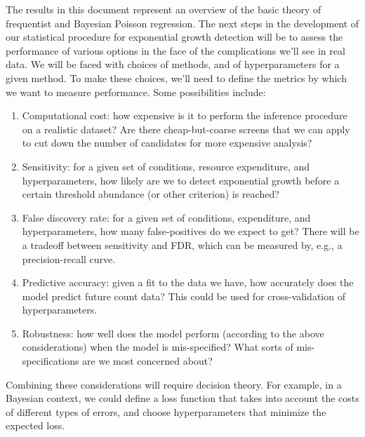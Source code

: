 \documentclass[12pt, letterpaper]{article}
\begin{document}
The results in this document represent an overview of the basic theory of frequentist and Bayesian Poisson regression.
The next steps in the development of our statistical procedure for exponential growth detection will be to assess the performance of various options in the face of the complications we'll see in real data.
We will be faced with choices of methods, and of hyperparameters for a given method.
To make these choices, we'll need to define the metrics by which we want to measure performance.
Some possibilities include:
\begin{enumerate}
    \item Computational cost: how expensive is it to perform the inference procedure on a realistic dataset? Are there cheap-but-coarse screens that we can apply to cut down the number of candidates for more expensive analysis?
    \item Sensitivity: for a given set of conditions, resource expenditure, and hyperparameters, how likely are we to detect exponential growth before a certain threshold abundance (or other criterion) is reached?
    \item False discovery rate: for a given set of conditions, expenditure, and hyperparameters, how many false-positives do we expect to get? There will be a tradeoff between sensitivity and FDR, which can be measured by, e.g., a precision-recall curve.
    \item Predictive accuracy: given a fit to the data we have, how accurately does the model predict future count data? This could be used for cross-validation of hyperparameters.
    \item Robustness: how well does the model perform (according to the above considerations) when the model is mis-specified? What sorts of mis-specifications are we most concerned about?
\end{enumerate}

Combining these considerations will require decision theory. For example, in a Bayesian context, we could define a loss function that takes into account the costs of different types of errors, and choose hyperparameters that minimize the expected loss.
\end{document}
